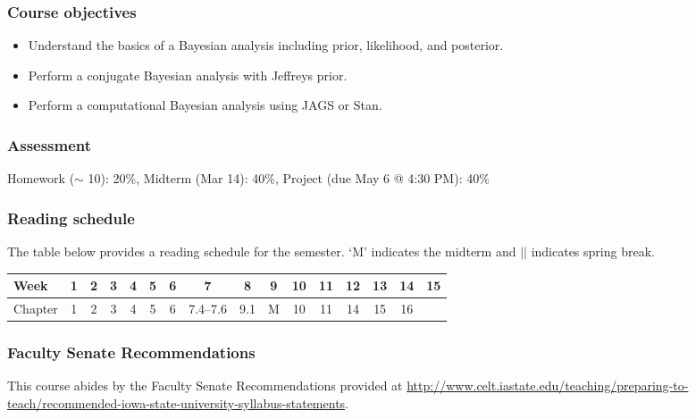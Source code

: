 \documentclass[12pt]{article}
\begin{document}
\subsubsection*{Course objectives}
\begin{itemize}
\item Understand the basics of a Bayesian analysis including prior, likelihood, and posterior. 
\item Perform a conjugate Bayesian analysis with Jeffreys prior.
\item Perform a computational Bayesian analysis using JAGS or Stan.
\end{itemize}

\subsubsection*{Assessment}

Homework ($\sim$ 10): 20\%, Midterm (Mar 14): 40\%, Project (due May 6 @ 4:30 PM): 40\%

\subsubsection*{Reading schedule}

The table below provides a reading schedule for the semester. `M' indicates the midterm and $\vert\vert$ indicates spring break. 

\vspace{0.2in} 

\begin{tabular}{|l|cccccccccc||ccccc|}
\hline
Week    & 1 & 2 & 3 & 4 & 5 & 6 & 7        & 8    & 9 & 10 & 11 & 12 & 13 & 14 & 15 \\
\hline
Chapter & 1 & 2 & 3 & 4 & 5 & 6 & 7.4--7.6 &  9.1 & M & 10 & 11 & 14 & 15 & 16 & \\
\hline
\end{tabular}

\subsubsection*{Faculty Senate Recommendations}

This course abides by the Faculty Senate Recommendations provided at \url{http://www.celt.iastate.edu/teaching/preparing-to-teach/recommended-iowa-state-university-syllabus-statements}.
\end{document}

